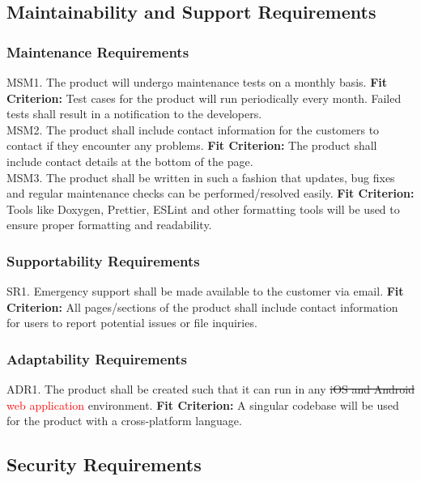 \documentclass[12pt, titlepage]{article}
\begin{document}
\subsection{Maintainability and Support Requirements}

\subsubsection{Maintenance Requirements}

MSM1. The product will undergo maintenance tests on a monthly basis.
	\textbf{Fit Criterion:} Test cases for the product will run periodically every month. Failed tests shall result in a notification to the developers.\\

\noindent MSM2. The product shall include contact information for the customers to contact if they encounter any problems.
	\textbf{Fit Criterion:}  The product shall include contact details at the bottom of the page.\\

\noindent MSM3. The product shall be written in such a fashion that updates, bug fixes and regular maintenance checks can be performed/resolved easily.
	\textbf{Fit Criterion:} Tools like Doxygen, Prettier, ESLint and other formatting tools will be used to ensure proper formatting and readability.

\subsubsection{Supportability Requirements}

SR1. Emergency support shall be made available to the customer via email.
	\textbf{Fit Criterion:} All pages/sections of the product shall include contact information for users to report potential issues or file inquiries. 

\subsubsection{Adaptability Requirements}

ADR1. The product shall be created such that it can run in any \sout{iOS and Android} \textcolor{red}{web application} environment.
	\textbf{Fit Criterion:} A singular codebase will be used for the product with a cross-platform language.

\subsection{Security Requirements}
\end{document}
